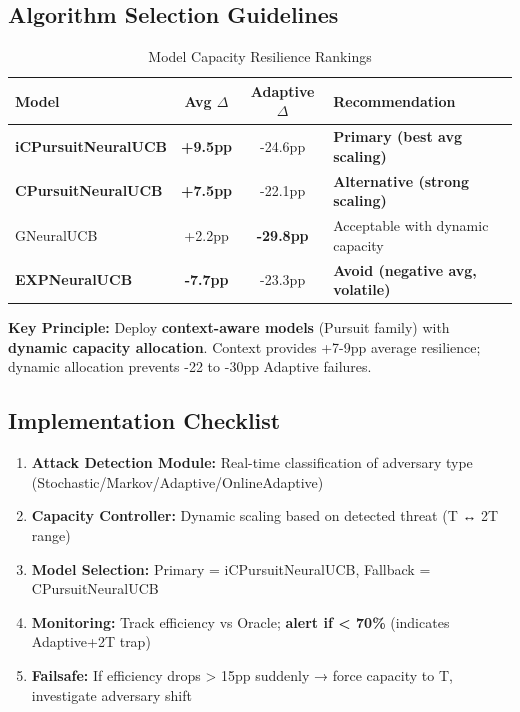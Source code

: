 \documentclass[11pt,a4paper]{article}
\newcommand{\critical}[1]{\textcolor{criticalcolor}{\textbf{#1}}}
\newcommand{\success}[1]{\textcolor{successcolor}{\textbf{#1}}}
\begin{document}
\subsection{Algorithm Selection Guidelines}

\vspace{-0.4cm}
\begin{table}[h]
\scriptsize
\centering
\begin{tabular}{lccl}
\toprule
\textbf{Model} & \textbf{Avg $\Delta$} & \textbf{Adaptive $\Delta$} & \textbf{Recommendation} \\
\midrule
\success{iCPursuitNeuralUCB} & \success{+9.5pp} & -24.6pp & \success{Primary (best avg scaling)} \\
\success{CPursuitNeuralUCB} & \success{+7.5pp} & -22.1pp & \success{Alternative (strong scaling)} \\
GNeuralUCB & +2.2pp & \critical{-29.8pp} & Acceptable with dynamic capacity \\
\critical{EXPNeuralUCB} & \critical{-7.7pp} & -23.3pp & \critical{Avoid (negative avg, volatile)} \\
\bottomrule
\end{tabular}
\vspace{-0.2cm}
\caption{Model Capacity Resilience Rankings}
\end{table}

\vspace{-0.2cm}
\textbf{Key Principle:} Deploy \success{context-aware models} (Pursuit family) with \success{dynamic capacity allocation}. Context provides +7-9pp average resilience; dynamic allocation prevents -22 to -30pp Adaptive failures.

\subsection{Implementation Checklist}

\vspace{-0.2cm}
\begin{enumerate}
    \vspace{-0.2cm}
    \item \textbf{Attack Detection Module:} Real-time classification of adversary type (Stochastic/Markov/Adaptive/OnlineAdaptive)
    \vspace{-0.2cm}
    \item \textbf{Capacity Controller:} Dynamic scaling based on detected threat (T ↔ 2T range)
    \vspace{-0.2cm}
    \item \textbf{Model Selection:} Primary = iCPursuitNeuralUCB, Fallback = CPursuitNeuralUCB
    \vspace{-0.2cm}
    \item \textbf{Monitoring:} Track efficiency vs Oracle; \critical{alert if < 70\%} (indicates Adaptive+2T trap)
    \vspace{-0.2cm}
    \item \textbf{Failsafe:} If efficiency drops > 15pp suddenly → force capacity to T, investigate adversary shift
\end{enumerate}
\end{document}
